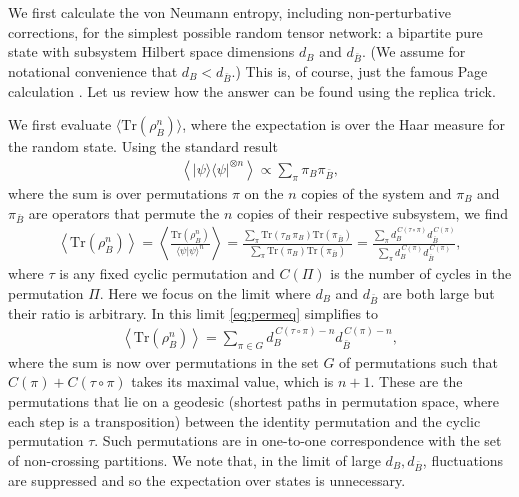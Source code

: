 \documentclass[11pt]{article}
\numberwithin{equation}{section}
\def\tr{\text{Tr}}
\begin{document}
We first calculate the von Neumann entropy, including non-perturbative corrections, for the simplest possible random tensor network: a bipartite pure state with subsystem Hilbert space dimensions $d_B$ and $d_{\bar B}$. (We assume for notational convenience that $d_B < d_{\bar B}$.) This is, of course, just the famous Page calculation \cite{Page:1993df}. Let us review how the answer can be found using the replica trick.

We first evaluate $\langle \tr (\rho_B^n) \rangle$, where the expectation is over the Haar measure for the random state. Using the standard result
\begin{align}
 \left\langle  |\psi \rangle\langle \psi|^{\otimes n}\right \rangle \propto \sum_\pi \pi_B \pi_{\bar B},
\end{align}
where the sum is over permutations $\pi$ on the $n$ copies of the system and $\pi_B$ and $\pi_{\bar B}$ are operators that permute the $n$ copies of their respective subsystem, we find
\begin{align}\label{eq:permeq}
\left\langle \tr (\rho_B^n)\right \rangle =\left \langle \frac{\tr (\rho_B^n)}{\langle\psi | \psi\rangle^n} \right\rangle = \frac{\sum_\pi \tr(\tau_B \,\pi_B) \tr(\pi_{\bar B})}{\sum_\pi \tr(\pi_B) \tr(\pi_{\bar B})} = \frac{\sum_\pi d_B^{\,C(\tau \circ \pi)} d_{\bar B}^{\,C(\pi)}}{\sum_\pi d_B^{\,C(\pi)} d_{\bar B}^{\,C(\pi)}},
\end{align}
where $\tau$ is any fixed cyclic permutation and $C(\Pi)$ is the number of cycles in the permutation $\Pi$. Here we focus on  the limit where $d_B$ and $d_{\bar B}$ are both large but their ratio is arbitrary. In this limit  \ref{eq:permeq} simplifies to
\begin{align} \label{eq:trrhoAn}
\left\langle \tr (\rho_B^n)\right \rangle = \sum_{\pi \in G} d_B^{\,C(\tau \circ \pi) - n} d_{\bar B}^{\,C(\pi) - n},
\end{align}
where the sum is now over permutations in the set $G$ of permutations such that $C(\pi) + C(\tau \circ \pi)$ takes its maximal value, which is $n +1$. These are the permutations that lie on a geodesic (shortest paths in permutation space, where each step is a transposition) between the identity permutation and the cyclic permutation $\tau$. Such permutations are in one-to-one correspondence with the set of non-crossing partitions. We note that, in the limit of large $d_B, d_{\bar{B}}$, fluctuations are suppressed and so the expectation over states is unnecessary. 
\end{document}

